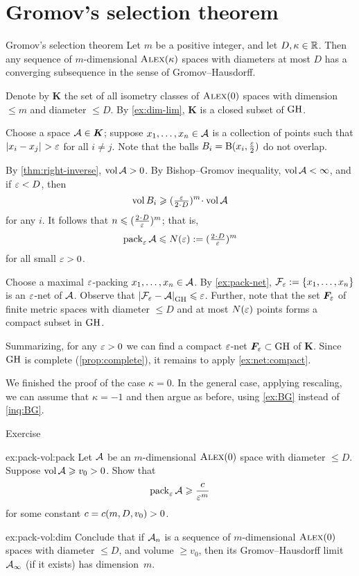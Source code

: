 \section{Gromov's selection theorem}

\begin{thm}{Gromov's selection theorem}\label{thm:gromov-compactness}
Let $m$ be a positive integer, and let $D,\kappa\in\mathbb{R}$.
Then any sequence of $m$-dimensional $\textsc{Alex}(\kappa)$ spaces with diameters at most $D$
has a converging subsequence in the sense of Gromov--Hausdorff.
\end{thm}

Denote by $\bm{K}$ the set of all isometry classes of $\textsc{Alex}(0)$ spaces with dimension $\le m$ and diameter $\le D$.
By \ref{ex:dim-lim}, $\bm{K}$ is a closed subset of $\operatorname{\rm GH}\nolimits$.

Choose a space $\mathcal{A}\in \bm{K}$;
suppose $x_1,\dots,x_n\in \mathcal{A}$ is a collection of points such that $|{x_i}-{x_j}|_{}^{{}}> \varepsilon$ for all $i\ne j$.
Note that the balls $B_i=\mathrm{B}{}(x_i,\tfrac{\varepsilon}2)$ do not overlap.

By \ref{thm:right-inverse}, $\operatorname{\rm vol}\nolimits \mathcal{A}>0$.
By Bishop--Gromov inequality, $\operatorname{\rm vol}\nolimits \mathcal{A}<\infty$,
and if $\varepsilon<D$, then 
\[\vol B_i\ge (\tfrac\eps{2\cdot D})^m\cdot\vol \spc{A}\]
for any $i$.
It follows that $n\le (\tfrac{2\cdot D}\eps)^m$;
that is, 
\[\pack_\eps\spc{A}\le  N(\eps)\df(\tfrac{2\cdot D}\eps)^m\]
for all small $\varepsilon>0$.

Choose a maximal $\varepsilon$-packing $x_1,\dots,x_n\in \mathcal{A}$.
By \ref{ex:pack-net}, $\mathcal{F}_\varepsilon\mathrel{:=}\{x_1,\dots,x_n\}$ is an $\varepsilon$-net of $\mathcal{A}$.
Observe that $|{\mathcal{F}_\varepsilon}-{\mathcal{A}}|_{\operatorname{\rm GH}\nolimits}^{{}}\leqslant \varepsilon$.
Further, note that the set $\bm{F}_\varepsilon$ of finite metric spaces with diameter $\le D$ and at most $N(\varepsilon)$ points forms a compact subset in $\operatorname{\rm GH}\nolimits$.

Summarizing, for any $\varepsilon>0$ we can find a compact $\varepsilon$-net $\bm{F}_\varepsilon\subset \operatorname{\rm GH}\nolimits$ of $\bm{K}$.
Since $\operatorname{\rm GH}\nolimits$ is complete (\ref{prop:complete}), it remains to apply \ref{ex:net:compact}.

We finished the proof of the case $\kappa=0$.
In the general case, applying rescaling, we can assume that $\kappa=-1$ and then argue as before, using \ref{ex:BG} instead of \ref{inq:BG}.
\qeds

\begin{thm}[!]{Exercise}\label{ex:pack-vol}

\begin{subthm}{ex:pack-vol:pack}
Let $\mathcal{A}$ be an $m$-dimensional $\textsc{Alex}(0)$ space with diameter $\le D$.
Suppose $\operatorname{\rm vol}\nolimits\mathcal{A}\geqslant v_0>0$.
Show that 
\[\operatorname{\rm pack}\nolimits_\varepsilon\mathcal{A}\geqslant \frac{c}{\varepsilon^m}\]
for some constant $c=c(m,D,v_0)>0$.
\end{subthm}


\begin{subthm}{ex:pack-vol:dim}
Conclude that if $\mathcal{A}_n$ is a sequence of $m$-dimensional $\textsc{Alex}(0)$ spaces with diameter $\le D$, and volume $\ge v_0$, then its Gromov--Hausdorff limit $\mathcal{A}_\infty$ (if it exists) has dimension~$m$.
\end{subthm}
\end{thm}


